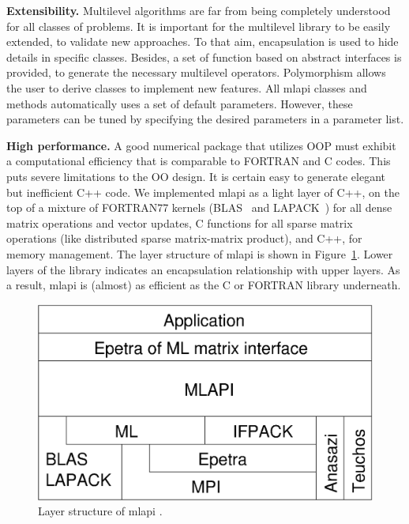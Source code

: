 \documentclass{article}[11pt]
\newcommand{\MLAPI}  {{\sc mlapi }}
\begin{document}
\noindent
{\bf Extensibility.} Multilevel algorithms are far from being completely
understood for all classes of problems. It is important for the multilevel
library to be easily extended, to validate new approaches. To that aim,
encapsulation is used to hide details in
specific classes. Besides, a set of function based on abstract interfaces
is provided, to generate the necessary multilevel operators. Polymorphism
allows the user to derive classes to implement new features.
All \MLAPI classes and methods automatically uses a set of
default parameters. However, these parameters can be tuned by specifying the
desired parameters in a parameter list.

\bigskip

\noindent
{\bf High performance.} A good numerical package that utilizes
OOP must exhibit a computational efficiency that is comparable to FORTRAN and
C codes. This puts severe limitations to the OO design. It is certain easy to
generate elegant but inefficient C++ code. 
We implemented \MLAPI as a light layer of
C++, on the top of
a mixture of FORTRAN77 kernels (BLAS~\cite{dongarra90set} and
                                LAPACK~\cite{demmel89lapack}) 
for all dense matrix
operations and vector updates, C functions for all sparse matrix operations
(like distributed sparse matrix-matrix product), and C++, for memory
management. The layer
structure of \MLAPI is shown in Figure~\ref{fig:layer}. Lower layers of the
library indicates an encapsulation relationship with upper layers. As a
result, \MLAPI is (almost) as
efficient as the C or FORTRAN library underneath.

\begin{figure}
\begin{center}
\includegraphics[width=12cm]{layer.eps}
\caption{Layer structure of \MLAPI.}
\label{fig:layer}
\end{center}
\end{figure}
\end{document}
